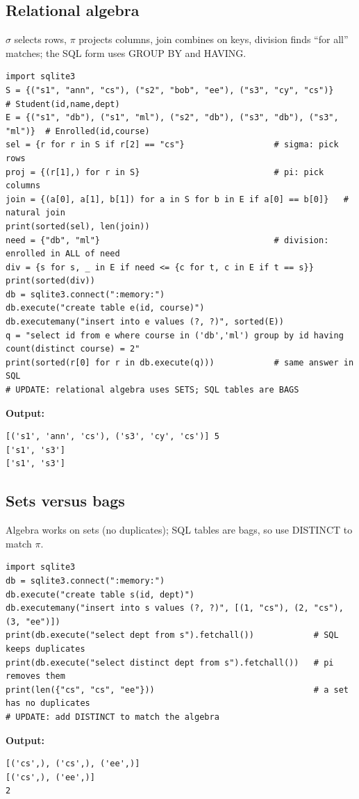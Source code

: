 \documentclass[11pt]{article}
\begin{document}
\subsection*{Relational algebra}
$\sigma$ selects rows, $\pi$ projects columns, join combines on keys, division finds ``for all'' matches; the SQL form uses GROUP BY and HAVING.
\begin{Verbatim}[fontsize=\footnotesize,frame=single]
import sqlite3
S = {("s1", "ann", "cs"), ("s2", "bob", "ee"), ("s3", "cy", "cs")}      # Student(id,name,dept)
E = {("s1", "db"), ("s1", "ml"), ("s2", "db"), ("s3", "db"), ("s3", "ml")}  # Enrolled(id,course)
sel = {r for r in S if r[2] == "cs"}                  # sigma: pick rows
proj = {(r[1],) for r in S}                           # pi: pick columns
join = {(a[0], a[1], b[1]) for a in S for b in E if a[0] == b[0]}   # natural join
print(sorted(sel), len(join))
need = {"db", "ml"}                                   # division: enrolled in ALL of need
div = {s for s, _ in E if need <= {c for t, c in E if t == s}}
print(sorted(div))
db = sqlite3.connect(":memory:")
db.execute("create table e(id, course)")
db.executemany("insert into e values (?, ?)", sorted(E))
q = "select id from e where course in ('db','ml') group by id having count(distinct course) = 2"
print(sorted(r[0] for r in db.execute(q)))            # same answer in SQL
# UPDATE: relational algebra uses SETS; SQL tables are BAGS
\end{Verbatim}
\textbf{Output:}
\begin{Verbatim}[fontsize=\footnotesize,frame=single]
[('s1', 'ann', 'cs'), ('s3', 'cy', 'cs')] 5
['s1', 's3']
['s1', 's3']
\end{Verbatim}
\subsection*{Sets versus bags}
Algebra works on sets (no duplicates); SQL tables are bags, so use DISTINCT to match $\pi$.
\begin{Verbatim}[fontsize=\footnotesize,frame=single]
import sqlite3
db = sqlite3.connect(":memory:")
db.execute("create table s(id, dept)")
db.executemany("insert into s values (?, ?)", [(1, "cs"), (2, "cs"), (3, "ee")])
print(db.execute("select dept from s").fetchall())            # SQL keeps duplicates
print(db.execute("select distinct dept from s").fetchall())   # pi removes them
print(len({"cs", "cs", "ee"}))                                # a set has no duplicates
# UPDATE: add DISTINCT to match the algebra
\end{Verbatim}
\textbf{Output:}
\begin{Verbatim}[fontsize=\footnotesize,frame=single]
[('cs',), ('cs',), ('ee',)]
[('cs',), ('ee',)]
2
\end{Verbatim}
\end{document}
